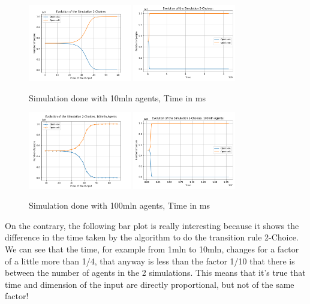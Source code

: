 \begin{figure}[!ht]
     \includegraphics[width=0.40\textwidth,height=0.17\textheight]{img/svg/2Choices/10mln/withoutTime.png}
     \centering
     \includegraphics[width=0.40\textwidth,height=0.17\textheight]{img/svg/2Choices/10mln/withtTime.png}
     \caption{Simulation done with 10mln agents, Time in ms}
\end{figure}
\newpage
\begin{figure}[!ht]
     \includegraphics[width=0.40\textwidth,height=0.17\textheight]{img/svg/2Choices/100mln/withoutTime.png}
     \centering
     \includegraphics[width=0.40\textwidth,height=0.17\textheight]{img/svg/2Choices/100mln/withTime.png}
     \caption{Simulation done with 100mln agents, Time in ms}
\end{figure}
On the contrary, the following bar plot is really interesting because it shows the difference in the time taken by the algorithm to do the transition rule 2-Choice. We can see that the time, for example from 1mln to 10mln, changes for a factor of a little more than 1/4, that anyway is less than the factor 1/10 that there is between the number of agents in the 2 simulations. This means that it’s true that time and dimension of the input are directly proportional, but not of the same factor!

